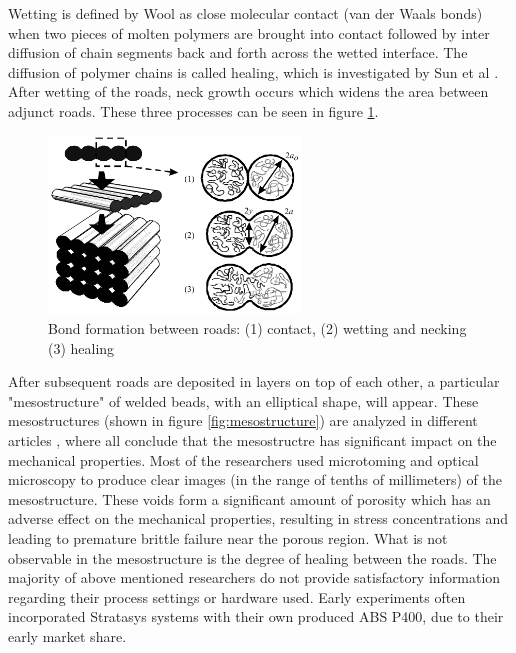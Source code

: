 Wetting is defined by Wool \cite{WoolStrenghtInterfaces} as close molecular contact (van der Waals bonds) when two pieces of molten polymers are brought into contact followed by inter diffusion of chain segments back and forth across the wetted interface. The diffusion of polymer chains is called healing, which is investigated by Sun et al \cite{Sun2008}. After wetting of the roads, neck growth occurs which widens the area between adjunct roads. These three processes can be seen in figure \ref{fig:polymerwelding}. 

\begin{figure}[htb]
    \centering
    \includegraphics[width=0.60\textwidth]{chapter_2/figures/polymerwelding.PNG}
    \caption{Bond formation between roads: (1) contact, (2) wetting and necking (3) healing  \cite{Sun2008}}
    \label{fig:polymerwelding}
\end{figure}

After subsequent roads are deposited in layers on top of each other, a particular "mesostructure" of welded beads, with an elliptical shape, will appear. These mesostructures (shown in figure \ref{fig:mesostructure}) are analyzed in different articles \cite{Somireddy2017MechanicalMesostructure,Somireddy2018DevelopmentFDM,Li2002CompositeProperties,Rodriguez2001MechanicalInvestigation,Rodriguez2003MechanicalModeling,Blok2018AnComposites,Sun2008}, where all conclude that the mesostructre has significant impact on the mechanical properties.
Most of the researchers used microtoming and optical microscopy to produce clear images (in the range of tenths of millimeters) of the mesostructure. These voids form a significant amount of porosity which has an adverse effect on the mechanical properties, resulting in stress concentrations and leading to premature brittle failure  near the porous region.  What is not observable in the mesostructure is the degree of healing between the roads. 
The majority of above mentioned researchers do not provide satisfactory information regarding their process settings or hardware used. Early experiments often incorporated Stratasys systems with their own produced ABS P400, due to their early market share. 

